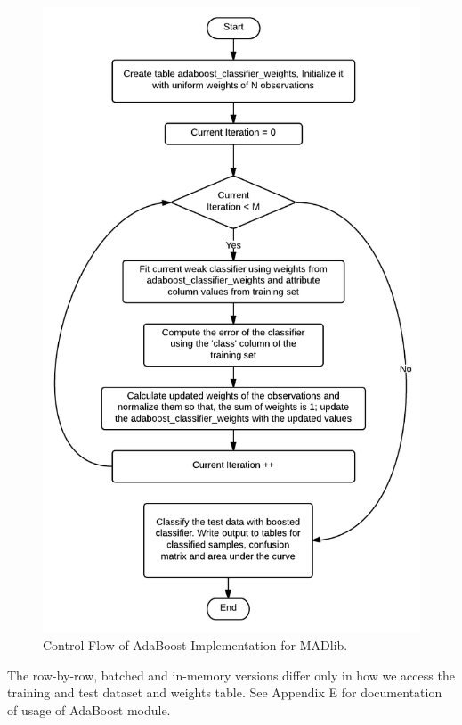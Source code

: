 \begin{figure}[h]
\centering
\includegraphics[scale=0.5]{adaimp.png}
\caption{Control Flow of AdaBoost Implementation for MADlib.}
\label{fig:adaimp}
\end{figure}

The row-by-row, batched and in-memory versions differ only in how we access the training and test dataset and weights table. See Appendix E for documentation of usage of AdaBoost module.



